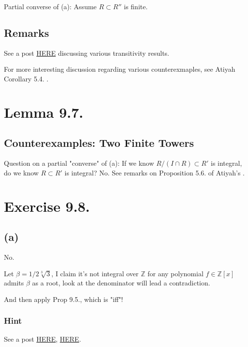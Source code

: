 \begin{comment}
Both statement (i) and (ii) are in fact iff.
Assume $R\subset R''$ are finite, i.e. \[R''=R\langle s\in S\rangle\] for a finite subset $S\subset R''$ of generators. Every element $x\in R'\subset R''$ could be express as a $R$-linear (coefficients in $R$) combination with generators in $S$. Therefore $R\subset R'$ is finite. For $R'\subset R''$, pick $x\in R''$ with expression and consider the coefficient of $R$ in $R'$. Generating set $S$ won't change, hence $R''$ could be regarded as a f.g. $R'$-module.
\end{comment}

Partial converse of (a): Assume $R\subset R''$ is finite. 

\subsection{Remarks}

See a post \href{https://math.stackexchange.com/questions/43353/transitivity-of-finitely-generated-condition}{HERE} discussing various transitivity results. 

For more interesting discussion regarding various counterexmaples, see Atiyah \cite{atiyah1994introduction} Corollary 5.4. .

\section{Lemma 9.7.}

\subsection{Counterexamples: Two Finite Towers}

Question on a partial "converse" of (a): If we know $R/(I\cap R)\subset R'$ is integral, do we know $R\subset R'$ is integral? No. See remarks on Proposition 5.6. of Atiyah's \cite{atiyah1994introduction}.

\section{Exercise 9.8.}

\subsection{(a)}

No.

Let $\beta=1/2\sqrt[3]{3}$, I claim it's not integral over $\mathbb Z$ for any polynomial $f\in \mathbb Z[x]$ admits $\beta$ as a root, look at the denominator will lead a contradiction.

And then apply Prop 9.5., which is "iff"!

\subsubsection{Hint}

See a post \href{https://math.stackexchange.com/questions/3770156/sqrt2-sqrt2-frac12-sqrt33-is-not-integral-over-mathbbz-s}{HERE}, \href{https://math.stackexchange.com/questions/2187396/checking-whether-a-given-element-is-integral-over-mathbbz}{HERE}.